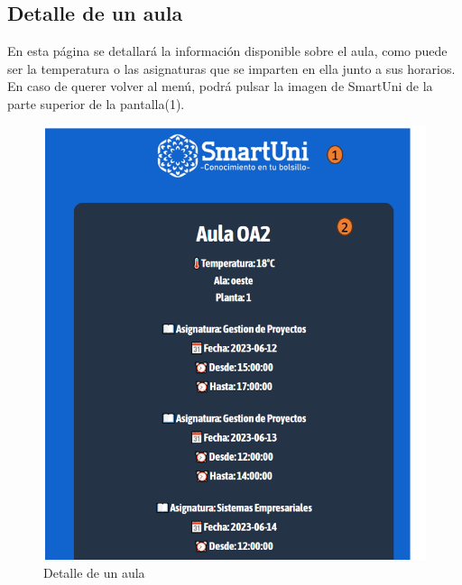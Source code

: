 \documentclass[12pt]{report}
\begin{document}
\begin{appendices}
\section{Detalle de un aula}
En esta página se detallará la información disponible sobre el aula, como puede ser la temperatura o las asignaturas que se imparten en ella junto a sus horarios. En caso de querer volver al menú, podrá pulsar la imagen de SmartUni de la parte superior de la pantalla(1).\\
\begin{figure}[H]
    \centering
    \includegraphics[scale = 0.7]{imagenes//manual_de_usuario/5.png}
    \caption{Detalle de un aula}
    \label{fig:Figura3.4.3}
\end{figure}
\newpage

\end{appendices}
\end{document}
